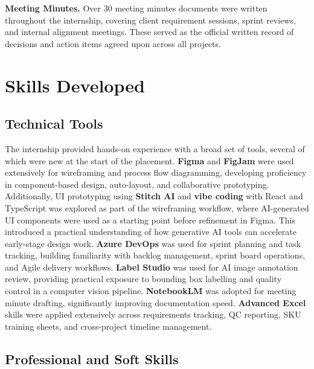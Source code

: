 \textbf{Meeting Minutes.} Over 30 meeting minutes documents were written throughout the internship, covering client requirement sessions, sprint reviews, and internal alignment meetings. These served as the official written record of decisions and action items agreed upon across all projects.

\section{Skills Developed}

\subsection{Technical Tools}

The internship provided hands-on experience with a broad set of tools, several of which were new at the start of the placement. \textbf{Figma} and \textbf{FigJam} were used extensively for wireframing and process flow diagramming, developing proficiency in component-based design, auto-layout, and collaborative prototyping. Additionally, UI prototyping using \textbf{Stitch AI} and \textbf{vibe coding} with React and TypeScript was explored as part of the wireframing workflow, where AI-generated UI components were used as a starting point before refinement in Figma. This introduced a practical understanding of how generative AI tools can accelerate early-stage design work. \textbf{Azure DevOps} was used for sprint planning and task tracking, building familiarity with backlog management, sprint board operations, and Agile delivery workflows. \textbf{Label Studio} was used for AI image annotation review, providing practical exposure to bounding box labelling and quality control in a computer vision pipeline. \textbf{NotebookLM} was adopted for meeting minute drafting, significantly improving documentation speed. \textbf{Advanced Excel} skills were applied extensively across requirements tracking, QC reporting, SKU training sheets, and cross-project timeline management.

\subsection{Professional and Soft Skills}

